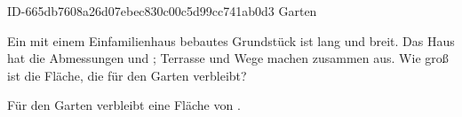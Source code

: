 \begin{exercise}
      {ID-665db7608a26d07ebec830c00c5d99cc741ab0d3}
      {Garten}
  \ifproblem\problem\par
    Ein mit einem Einfamilienhaus bebautes Grundstück ist  lang und
     breit. Das Haus hat die Abmessungen  und ;
    Terrasse und Wege machen zusammen  aus. Wie groß ist die
    Fläche, die für den Garten verbleibt?
  \fi
  \ifoutcome\outcome\par
    Für den Garten verbleibt eine Fläche von .
  \fi
\end{exercise}
